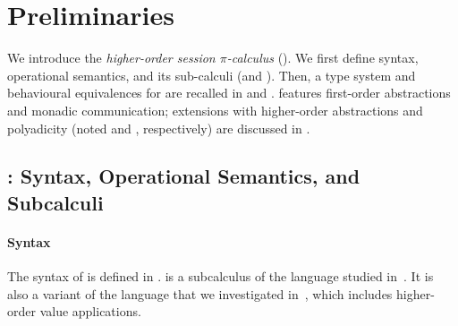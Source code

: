 \documentclass[preprint,11pt]{elsarticle}
\begin{document}
{%

\section{Preliminaries}
\label{sec:prelim}

We introduce 
the \emph{higher-order session $\pi$-calculus} (\HOp).
We first define 
syntax, operational semantics, and 
its sub-calculi (\sessp and \HO).
Then, a type system and behavioural equivalences for \HOp are recalled in 
 and . 
\HOp features first-order abstractions and monadic communication; extensions 
with higher-order abstractions and polyadicity (noted \HOpp and \PHOp, respectively) 
are discussed in .




\subsection{\HOp: Syntax, Operational Semantics, and Subcalculi}
\label{subsec:syntax}

\paragraph{Syntax}
The syntax of \HOp is defined in .
\HOp  is a subcalculus of the language studied 
in~\cite{tlca07}. It is also a variant of the language that we investigated in~\cite{characteristic_bis}, 
which includes higher-order value applications. 




}
\end{document}
